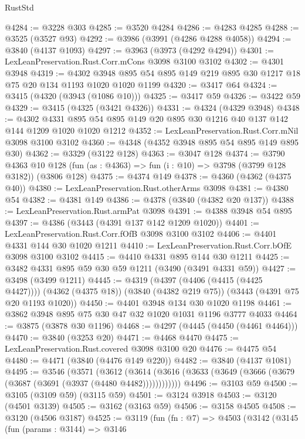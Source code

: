 \begin{lexlean}{RustStd}
\begin{coremodule}
@4284 := @3228 @303
@4285 := @3520 @4284
@4286 := @4283 @4285
@4288 := @3525 (@3527 @93)
@4292 := @3986 (@3991 (@4286 @4288 @4058))
@4294 := @3840 (@4137 @1093)
@4297 := @3963 (@3973 (@4292 @4294))
@4301 := LexLeanPreservation.Rust.Corr.mCons @3098 @3100 @3102
@4302 := @4301 @3948
@4319 := @4302 @3948 @895 @54 @895 @149 @219 @895 @30 @1217 @18 @75 @20 @134 @1193 @1020 @1020 @1199
@4320 := @3417 @64
@4324 := @3415 (@4320 (@3943 (@1086 @10)))
@4325 := @3417 @59
@4326 := @3422 @59
@4329 := @3415 (@4325 (@3421 @4326))
@4331 := @4324 (@4329 @3948)
@4348 := @4302
    @4331
    @895
    @54
    @895
    @149
    @20
    @895
    @30
    @1216
    @40
    @137
    @142
    @144
    @1209
    @1020
    @1020
    @1212
@4352 := LexLeanPreservation.Rust.Corr.mNil @3098 @3100 @3102
@4360 := @4348 (@4352 @3948 @895 @54 @895 @149 @895 @30)
@4362 := @3329 (@3122 @128)
@4363 := @3047 @128
@4374 := @3790
    @4363
    @10
    @128
    (fun (as : @4363) => fun (i : @10) => @3798 (@3799 @128 @3182))
    (@3806 @128)
@4375 := @4374 @149
@4378 := @4360 (@4362 (@4375 @40))
@4380 := LexLeanPreservation.Rust.otherArms @3098
@4381 := @4380 @54
@4382 := @4381 @149
@4386 := @4378 (@3840 (@4382 @20 @137))
@4388 := LexLeanPreservation.Rust.armPat @3098
@4391 := @4388 @3948 @54 @895
@4397 := @4386 (@3443 (@4391 @137 @142 @1209 @1020))
@4401 := LexLeanPreservation.Rust.Corr.fOfB @3098 @3100 @3102
@4406 := @4401 @4331 @144 @30 @1020 @1211
@4410 := LexLeanPreservation.Rust.Corr.bOfE @3098 @3100 @3102
@4415 := @4410 @4331 @895 @144 @30 @1211
@4425 := @3482 @4331 @895 @59 @30 @59 @1211 (@3490 (@3491 @4331 @59))
@4427 := @3498 (@3499 @1211)
@4445 := @4319
    (@4397 (@4406 (@4415 (@4425 @4427))))
    (@4362 (@4375 @18))
    (@3840 (@4382 @219 @75))
    (@3443 (@4391 @75 @20 @1193 @1020))
@4450 := @4401 @3948 @134 @30 @1020 @1198
@4461 := @3862 @3948 @895 @75 @30 @47 @32 @1020 @1031 @1196 @3777 @4033
@4464 := @3875 (@3878 @30 @1196)
@4468 := @4297 (@4445 (@4450 (@4461 @4464)))
@4470 := @3840 (@3253 @20)
@4471 := @4468 @4470
@4475 := LexLeanPreservation.Rust.covered @3098 @3100 @20
@4476 := @4475 @54
@4480 := @4471 (@3840 (@4476 @149 @220))
@4482 := @3840 (@4137 @1081)
@4495 := @3546
    (@3571
      (@3612 (@3614 (@3616 (@3633 (@3649 (@3666 (@3679 (@3687 (@3691 (@3937 (@4480 @4482))))))))))))
@4496 := @3103 @59
@4500 := @3105 (@3109 @59) (@3115 @59)
@4501 := @3124 @3918
@4503 := @3120 (@4501 @3139)
@4505 := @3162 (@3163 @59)
@4506 := @3158 @4505
@4508 := @3120 (@4506 @3187)
@4525 := @3119
    (fun (fn : @7) =>
    @4503
      (@3142
        (@3145
          (fun (params : @3144) =>
          @3146

\end{coremodule}
\end{lexlean}
